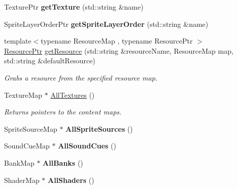 \begin{DoxyCompactItemize}
\item 
\hypertarget{classDCEngine_1_1Systems_1_1Content_a4655de95ae1c0453eda26aefd78b845c}{Texture\-Ptr {\bfseries get\-Texture} (std\-::string \&name)}\label{classDCEngine_1_1Systems_1_1Content_a4655de95ae1c0453eda26aefd78b845c}

\item 
\hypertarget{classDCEngine_1_1Systems_1_1Content_a43f242646a99a40b9749293795601477}{Sprite\-Layer\-Order\-Ptr {\bfseries get\-Sprite\-Layer\-Order} (std\-::string \&name)}\label{classDCEngine_1_1Systems_1_1Content_a43f242646a99a40b9749293795601477}

\item 
{\footnotesize template$<$typename Resource\-Map , typename Resource\-Ptr $>$ }\\\hyperlink{classDCEngine_1_1Resource}{Resource\-Ptr} \hyperlink{classDCEngine_1_1Systems_1_1Content_a92df7e4fd77e9e4fc4204d9c880c8248}{get\-Resource} (std\-::string \&resource\-Name, Resource\-Map map, std\-::string \&default\-Resource)
\begin{DoxyCompactList}\small\item\em Grabs a resource from the specified resource map. \end{DoxyCompactList}\item 
Texture\-Map $\ast$ \hyperlink{classDCEngine_1_1Systems_1_1Content_a42db625bcbfb6f7ef78ec9021b87d67f}{All\-Textures} ()
\begin{DoxyCompactList}\small\item\em Returns pointers to the content maps. \end{DoxyCompactList}\item 
\hypertarget{classDCEngine_1_1Systems_1_1Content_a50cfd9d9a15fcf6fe711eb59d63e03c4}{Sprite\-Source\-Map $\ast$ {\bfseries All\-Sprite\-Sources} ()}\label{classDCEngine_1_1Systems_1_1Content_a50cfd9d9a15fcf6fe711eb59d63e03c4}

\item 
\hypertarget{classDCEngine_1_1Systems_1_1Content_a7f876b92447ff49b6d7907f0c2e362b4}{Sound\-Cue\-Map $\ast$ {\bfseries All\-Sound\-Cues} ()}\label{classDCEngine_1_1Systems_1_1Content_a7f876b92447ff49b6d7907f0c2e362b4}

\item 
\hypertarget{classDCEngine_1_1Systems_1_1Content_aa215e996bfe9a49e46f686fffd56f6b4}{Bank\-Map $\ast$ {\bfseries All\-Banks} ()}\label{classDCEngine_1_1Systems_1_1Content_aa215e996bfe9a49e46f686fffd56f6b4}

\item 
\hypertarget{classDCEngine_1_1Systems_1_1Content_ad8e840c065a39aa71031aa4161509f17}{Shader\-Map $\ast$ {\bfseries All\-Shaders} ()}\label{classDCEngine_1_1Systems_1_1Content_ad8e840c065a39aa71031aa4161509f17}


\end{DoxyCompactItemize}
